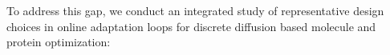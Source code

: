 To address this gap, we conduct an integrated study of representative design choices in online adaptation loops for discrete diffusion based molecule and protein optimization:





